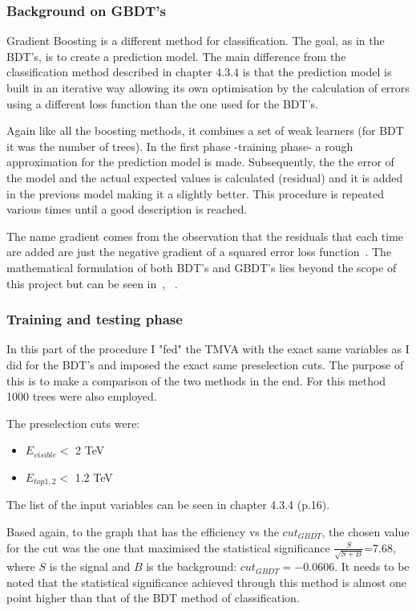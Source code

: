 \documentclass[12pt,a4paper]{report}
\begin{document}
\subsubsection{Background on GBDT's}

Gradient Boosting is a different method for classification. The goal, as in the BDT's, is to create a 
prediction model. The main difference from the classification method described in chapter 4.3.4 is that 
the prediction model is built in an iterative way allowing its own optimisation by the calculation of errors
using a different loss function than the one used for the BDT's.

Again like all the boosting methods, it combines a set of weak learners (for BDT it was the number of trees).
In the first phase -training phase- a rough approximation for the prediction model is made. Subsequently, the 
the error of the model and the actual expected values is calculated (residual) and it is added in the
previous model making it a slightly  better. This procedure is repeated various times until a good description
is reached. 

The name gradient comes from the observation that the residuals that each time are added are just the 
negative gradient of a squared error loss function~\cite{hoecker2007tmva}. The mathematical formulation of 
both BDT's and GBDT's lies beyond the scope of this project but can be seen in~\cite{schapire1999brief},
~\cite{hoecker2007tmva}.


\subsubsection{Training and testing phase}

In this part of the procedure I "fed" the TMVA with the exact same variables as I did for the BDT's and 
imposed the exact same preselection cuts. The purpose of this is to make a comparison of the two methods in 
the end. For this method 1000 trees were also employed.

The preselection cuts were:

\begin{itemize}
 \item $E_{visible} <$ 2 TeV
 \item $E_{top1,2} <$ 1.2 TeV
\end{itemize}

The list of the input variables can be seen in chapter 4.3.4 (p.16).

Based again, to the graph that has the efficiency vs the $cut_{GBDT}$, the chosen value for the cut was the one
that maximised the statistical significance $\frac{S}{\sqrt{S+B}}$=7.68, where $S$ is the signal and $B$ is the 
background: $cut_{GBDT}=-0.0606$. It needs to be noted that the statistical significance achieved through
this method is almost one point higher than that of the BDT method of classification.
\end{document}
